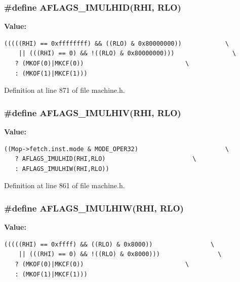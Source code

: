 \subsubsection[{AFLAGS\_\-IMULHID}]{\setlength{\rightskip}{0pt plus 5cm}\#define AFLAGS\_\-IMULHID(RHI, \/  RLO)}\label{machine_8h_74f9188eaf78c40ce9f2e3f749104f00}


\textbf{Value:}

\begin{Code}\begin{verbatim}(((((RHI) == 0xffffffff) && ((RLO) & 0x80000000))            \
    || (((RHI) == 0) && !((RLO) & 0x80000000)))                \
   ? (MKOF(0)|MKCF(0))                            \
   : (MKOF(1)|MKCF(1)))
\end{verbatim}
\end{Code}


Definition at line 871 of file machine.h.
\subsubsection[{AFLAGS\_\-IMULHIV}]{\setlength{\rightskip}{0pt plus 5cm}\#define AFLAGS\_\-IMULHIV(RHI, \/  RLO)}\label{machine_8h_f0ac199708f731dea60e5d273c3ca826}


\textbf{Value:}

\begin{Code}\begin{verbatim}((Mop->fetch.inst.mode & MODE_OPER32)                        \
   ? AFLAGS_IMULHID(RHI,RLO)                        \
   : AFLAGS_IMULHIW(RHI,RLO))
\end{verbatim}
\end{Code}


Definition at line 861 of file machine.h.
\subsubsection[{AFLAGS\_\-IMULHIW}]{\setlength{\rightskip}{0pt plus 5cm}\#define AFLAGS\_\-IMULHIW(RHI, \/  RLO)}\label{machine_8h_2f3c9315642d19ec89eb89c872bd6091}


\textbf{Value:}

\begin{Code}\begin{verbatim}(((((RHI) == 0xffff) && ((RLO) & 0x8000))                \
    || (((RHI) == 0) && !((RLO) & 0x8000)))                \
   ? (MKOF(0)|MKCF(0))                            \
   : (MKOF(1)|MKCF(1)))
\end{verbatim}
\end{Code}


